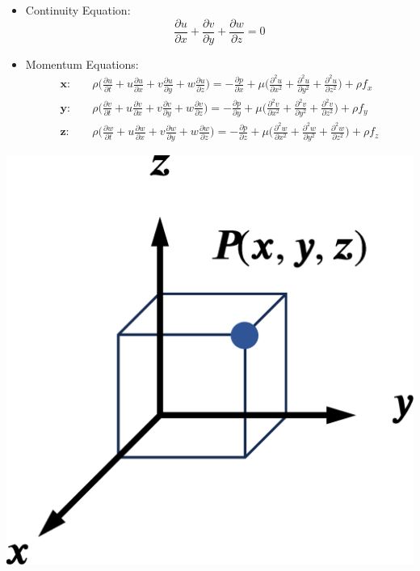 \documentclass[a4paper]{article}
\begin{document}
\begin{minipage}{.75\textwidth}
\begin{itemize}
    \item Continuity Equation:
    \[\frac{\partial u}{\partial x} + \frac{\partial v}{\partial y} + \frac{\partial w}{\partial z}=0\]
    
    \item Momentum Equations:
    \begin{align*}
        \boldsymbol{x:} \quad & \rho \bigg(\frac{\partial u}{\partial t} + u \frac{\partial u}{\partial x} + v\frac{\partial u}{\partial y} + w\frac{\partial u}{\partial z} \bigg) = -\frac{\partial p}{\partial x} + \mu \bigg(\frac{\partial^{2} u}{\partial x^{2}} + \frac{\partial^{2} u}{\partial y^{2}} + \frac{\partial^{2} u}{\partial z^{2}}\bigg) + \rho f_{x} \\[1em]
        \boldsymbol{y:} \quad & \rho \bigg(\frac{\partial v}{\partial t} + u \frac{\partial v}{\partial x} + v\frac{\partial v}{\partial y} + w\frac{\partial v}{\partial z} \bigg) = -\frac{\partial p}{\partial y} + \mu \bigg(\frac{\partial^{2} v}{\partial x^{2}} + \frac{\partial^{2} v}{\partial y^{2}} + \frac{\partial^{2} v}{\partial z^{2}}\bigg) + \rho f_{y} \\[1em]
        \boldsymbol{z:} \quad & \rho \bigg(\frac{\partial w}{\partial t} + u \frac{\partial w}{\partial x} + v\frac{\partial w}{\partial y} + w\frac{\partial w}{\partial z} \bigg) = -\frac{\partial p}{\partial z} + \mu \bigg(\frac{\partial^{2} w}{\partial x^{2}} + \frac{\partial^{2} w}{\partial y^{2}} + \frac{\partial^{2} w}{\partial z^{2}}\bigg) + \rho f_{z}
    \end{align*}
\end{itemize}
\end{minipage}
\begin{minipage}{.25\textwidth}
    \includegraphics[width=.9\textwidth]{img/cartesian_coord_sys.eps}
\end{minipage}
\end{document}
